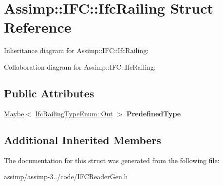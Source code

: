 \hypertarget{struct_assimp_1_1_i_f_c_1_1_ifc_railing}{\section{Assimp\+:\+:I\+F\+C\+:\+:Ifc\+Railing Struct Reference}
\label{struct_assimp_1_1_i_f_c_1_1_ifc_railing}
}


Inheritance diagram for Assimp\+:\+:I\+F\+C\+:\+:Ifc\+Railing\+:


Collaboration diagram for Assimp\+:\+:I\+F\+C\+:\+:Ifc\+Railing\+:
\subsection*{Public Attributes}
\begin{DoxyCompactItemize}
\item 
\hypertarget{struct_assimp_1_1_i_f_c_1_1_ifc_railing_a04d92dbb95a80c593363518acfd2c6e3}{\hyperlink{struct_assimp_1_1_s_t_e_p_1_1_maybe}{Maybe}$<$ \hyperlink{classboost_1_1shared__ptr}{Ifc\+Railing\+Type\+Enum\+::\+Out} $>$ {\bfseries Predefined\+Type}}\label{struct_assimp_1_1_i_f_c_1_1_ifc_railing_a04d92dbb95a80c593363518acfd2c6e3}

\end{DoxyCompactItemize}
\subsection*{Additional Inherited Members}


The documentation for this struct was generated from the following file\+:\begin{DoxyCompactItemize}
\item 
assimp/assimp-\/3../code/I\+F\+C\+Reader\+Gen.\+h\end{DoxyCompactItemize}
